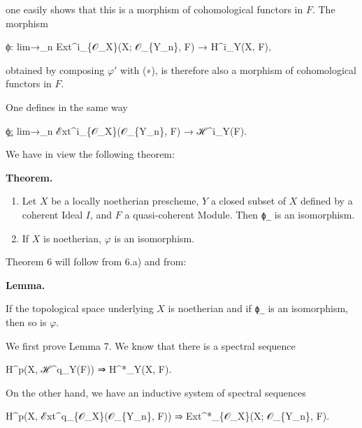 \documentclass[
]{article}
\newenvironment{Shaded}{}{}
\newcommand{\NormalTok}[1]{#1}
\begin{document}
one easily shows that this is a morphism of cohomological functors in
\(F\). The morphism

\begin{Shaded}
\begin{Highlighting}[]
\NormalTok{ϕ: lim→\_n Ext\^{}i\_\{𝒪\_X\}(X; 𝒪\_\{Y\_n\}, F) → H\^{}i\_Y(X, F),}
\end{Highlighting}
\end{Shaded}

obtained by composing \(\varphi'\) with (∗), is therefore also a
morphism of cohomological functors in \(F\).

One defines in the same way

\begin{Shaded}
\begin{Highlighting}[]
\NormalTok{ϕ̲: lim→\_n ℰxt\^{}i\_\{𝒪\_X\}(𝒪\_\{Y\_n\}, F) → ℋ\^{}i\_Y(F).}
\end{Highlighting}
\end{Shaded}

We have in view the following theorem:

\textbf{Theorem.}

\begin{enumerate}
\def\labelenumi{\alph{enumi})}
\item
  Let \(X\) be a locally noetherian prescheme, \(Y\) a closed subset of
  \(X\) defined by a coherent Ideal \(I\), and \(F\) a quasi-coherent
  Module. Then \texttt{ϕ̲} is an isomorphism.
\item
  If \(X\) is noetherian, \(\varphi\) is an isomorphism.
\end{enumerate}

Theorem 6 will follow from 6.a) and from:

\textbf{Lemma.}

If the topological space underlying \(X\) is noetherian and if
\texttt{ϕ̲} is an isomorphism, then so is \(\varphi\).

We first prove Lemma 7. We know that there is a spectral sequence

\begin{Shaded}
\begin{Highlighting}[]
\NormalTok{H\^{}p(X, ℋ\^{}q\_Y(F)) ⇒ H\^{}*\_Y(X, F).}
\end{Highlighting}
\end{Shaded}

On the other hand, we have an inductive system of spectral sequences

\begin{Shaded}
\begin{Highlighting}[]
\NormalTok{H\^{}p(X, ℰxt\^{}q\_\{𝒪\_X\}(𝒪\_\{Y\_n\}, F)) ⇒ Ext\^{}*\_\{𝒪\_X\}(X; 𝒪\_\{Y\_n\}, F).}
\end{Highlighting}
\end{Shaded}
\end{document}

